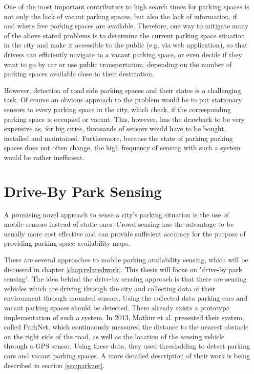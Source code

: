 One of the most important contributors to high search times for parking spaces is not only the lack of vacant parking spaces, but also the lack of information, if and where free parking spaces are available. Therefore, one way to mitigate many of the above stated problems is to determine the current parking space situation in the city and make it accessible to the public (e.g. via web application), so that drivers can efficiently navigate to a vacant parking space, or even decide if they want to go by car or use public transportation, depending on the number of parking spaces available close to their destination. 

However, detection of road side parking spaces and their states is a challenging task. Of course an obvious approach to the problem would be to put stationary sensors to every parking space in the city, which check, if the corresponding parking space is occupied or vacant. This, however, has the drawback to be very expensive as, for big cities, thousands of sensors would have to be bought, installed and maintained. Furthermore, because the state of parking parking spaces does not often change, the high frequency of sensing with such a system would be rather inefficient.





\section{Drive-By Park Sensing}

A promising novel approach to sense a city's parking situation is the use of mobile sensors instead of static ones. Crowd sensing has the advantage to be usually more cost effective and can provide sufficient accuracy for the purpose of providing parking space availability maps.

There are several approaches to mobile parking availability sensing, which will be discussed in chapter \ref{chap:relatedwork}. This thesis will focus on "drive-by park sensing". The idea behind the drive-by sensing approach is that there are sensing vehicles which are driving through the city and collecting data of their environment through mounted sensors. Using the collected data parking cars and vacant parking spaces should be detected. There already exists a prototype implementation of such a system. In 2013, Mathur et al. \cite{Mathur:2010:PDS:1814433.1814448} presented their system, called ParkNet, which continuously measured the distance to the nearest obstacle on the right side of the road, as well as the location of the sensing vehicle through a GPS sensor. Using these data, they used thresholding to detect parking cars and vacant parking spaces. A more detailed description of their work is being described in section \ref{sec:parknet}.

